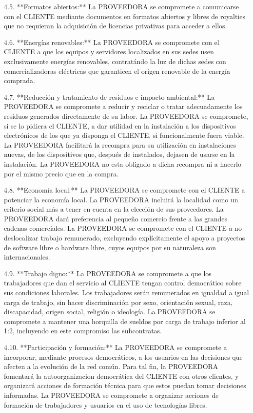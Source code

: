4.5. **Formatos abiertos:**
	La PROVEEDORA se compromete a comunicarse con el CLIENTE mediante documentos
	en formatos abiertos y libres de royalties
	que no requieran la adquisición de licencias privativas para acceder a ellos.

4.6. **Energías renovables:**
	La PROVEEDORA se compromete con el CLIENTE a que
	los equipos y servidores localizados en sus sedes
	usen exclusivamente energías renovables,
	contratándo la luz de dichas sedes
	con comercializadoras eléctricas que garanticen el origen renovable de la energía comprada.

4.7. **Reducción y tratamiento de residuos e impacto ambiental:**
	La PROVEEDORA se compromete a reducir y reciclar o tratar adecuadamente los residuos generados directamente de su labor.
	La PROVEEDORA se compromete, si se lo pidiera el CLIENTE,
	a dar utilidad en la instalación a los dispositivos electrónicos de los que ya disponga el CLIENTE,
	si funcionalmente fuera viable.
	La PROVEEDORA facilitará la recompra para su utilización en instalaciones nuevas,
	de los dispositivos que, después de instalados, dejasen de usarse en la instalación.
	La PROVEEDORA no esta obligado a dicha recompra ni a hacerlo por el mismo precio que en la compra.

4.8. **Economía local:**
	La PROVEEDORA se compromete con el CLIENTE a potenciar la economía local.
	La PROVEEDORA incluirá la localidad como un criterio social
	más a tener en cuenta en la elección de sus proveedores.
	La PROVEEDORA dará preferencia al pequeño comercio frente a las grandes cadenas comerciales.
	La PROVEEDORA se compromete con el CLIENTE a no deslocalizar trabajo remunerado,
	excluyendo explícitamente el apoyo a proyectos de software libre o hardware libre,
	cuyos equipos por su naturaleza son internacionales.

4.9. **Trabajo digno:**
	La PROVEEDORA se compromete a que los trabajadores que dan el servicio al CLIENTE
	tengan control democrático sobre sus condiciones laborales.
	Los trabajadores serán remunerados en igualdad a igual carga de trabajo,
	sin hacer discriminación por sexo, orientación sexual, raza, discapacidad,
	origen social, religión o ideología.
	La PROVEEDORA se compromete a mantener una horquilla de sueldos por carga de trabajo
	inferior al 1:2, incluyendo en este compromiso las subcontratas.

4.10. **Participación y formación:**
	La PROVEEDORA se compromete a incorporar, mediante procesos democráticos, a los usuarios
	en las decisiones que afecten a la evolución de la red común.
	Para tal fin, la PROVEEDORA fomentará la autoorganizacion democrática del CLIENTE con otros clientes,
	y organizará acciones de formación técnica para que estos puedan tomar decisiones informadas.
	La PROVEEDORA se compromete a organizar acciones de formación 
	de trabajadores y usuarios en el uso de tecnologías libres.

